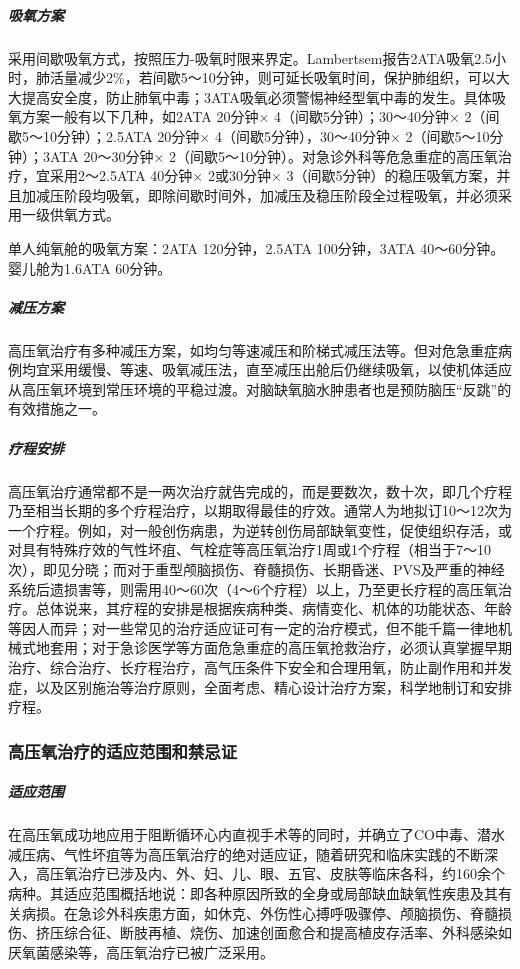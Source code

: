\subparagraph{吸氧方案}

采用间歇吸氧方式，按照压力-吸氧时限来界定。Lambertsem报告2ATA吸氧2.5小时，肺活量减少2\%，若间歇5～10分钟，则可延长吸氧时间，保护肺组织，可以大大提高安全度，防止肺氧中毒；3ATA吸氧必须警惕神经型氧中毒的发生。具体吸氧方案一般有以下几种，如2ATA
20分钟× 4（间歇5分钟）；30～40分钟× 2（间歇5～10分钟）；2.5ATA 20分钟×
4（间歇5分钟），30～40分钟× 2（间歇5～10分钟）；3ATA 20～30分钟×
2（间歇5～10分钟）。对急诊外科等危急重症的高压氧治疗，宜采用2～2.5ATA
40分钟× 2或30分钟×
3（间歇5分钟）的稳压吸氧方案，并且加减压阶段均吸氧，即除间歇时间外，加减压及稳压阶段全过程吸氧，并必须采用一级供氧方式。

单人纯氧舱的吸氧方案：2ATA 120分钟，2.5ATA 100分钟，3ATA
40～60分钟。婴儿舱为1.6ATA 60分钟。

\subparagraph{减压方案}

高压氧治疗有多种减压方案，如均匀等速减压和阶梯式减压法等。但对危急重症病例均宜采用缓慢、等速、吸氧减压法，直至减压出舱后仍继续吸氧，以使机体适应从高压氧环境到常压环境的平稳过渡。对脑缺氧脑水肿患者也是预防脑压“反跳”的有效措施之一。

\subparagraph{疗程安排}

高压氧治疗通常都不是一两次治疗就告完成的，而是要数次，数十次，即几个疗程乃至相当长期的多个疗程治疗，以期取得最佳的疗效。通常人为地拟订10～12次为一个疗程。例如，对一般创伤病患，为逆转创伤局部缺氧变性，促使组织存活，或对具有特殊疗效的气性坏疽、气栓症等高压氧治疗1周或1个疗程（相当于7～10次），即见分晓；而对于重型颅脑损伤、脊髓损伤、长期昏迷、PVS及严重的神经系统后遗损害等，则需用40～60次（4～6个疗程）以上，乃至更长疗程的高压氧治疗。总体说来，其疗程的安排是根据疾病种类、病情变化、机体的功能状态、年龄等因人而异；对一些常见的治疗适应证可有一定的治疗模式，但不能千篇一律地机械式地套用；对于急诊医学等方面危急重症的高压氧抢救治疗，必须认真掌握早期治疗、综合治疗、长疗程治疗，高气压条件下安全和合理用氧，防止副作用和并发症，以及区别施治等治疗原则，全面考虑、精心设计治疗方案，科学地制订和安排疗程。

\subsubsection{高压氧治疗的适应范围和禁忌证}

\subparagraph{适应范围}

在高压氧成功地应用于阻断循环心内直视手术等的同时，并确立了CO中毒、潜水减压病、气性坏疽等为高压氧治疗的绝对适应证，随着研究和临床实践的不断深入，高压氧治疗已涉及内、外、妇、儿、眼、五官、皮肤等临床各科，约160余个病种。其适应范围概括地说：即各种原因所致的全身或局部缺血缺氧性疾患及其有关病损。在急诊外科疾患方面，如休克、外伤性心搏呼吸骤停、颅脑损伤、脊髓损伤、挤压综合征、断肢再植、烧伤、加速创面愈合和提高植皮存活率、外科感染如厌氧菌感染等，高压氧治疗已被广泛采用。

